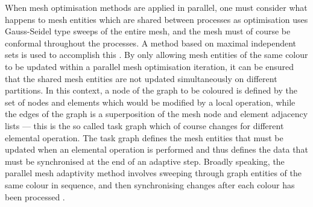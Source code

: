 When mesh optimisation methods are applied in parallel, one must
consider what happens to mesh entities which are shared between
processes as optimisation uses Gauss-Seidel type sweeps of the entire
mesh, and the mesh must of course be conformal throughout the
processes. A method based on maximal independent sets is used to
accomplish this \citep{jones1997, freitag1999b, freitag1999}. By only
allowing mesh entities of the same colour to be updated within a
parallel mesh optimisation iteration, it can be ensured that the
shared mesh entities are not updated simultaneously on different
partitions. In this context, a node of the graph to be coloured is
defined by the set of nodes and elements which would be modified by a
local operation, while the edges of the graph is a superposition of
the mesh node and element adjacency lists --- this is the so called
task graph which of course changes for different elemental
operation. The task graph defines the mesh entities that must be
updated when an elemental operation is performed and thus defines the
data that must be synchronised at the end of an adaptive step. Broadly
speaking, the parallel mesh adaptivity method involves sweeping
through graph entities of the same colour in sequence, and then
synchronising changes after each colour has been processed
\citep{freitag1999}.
